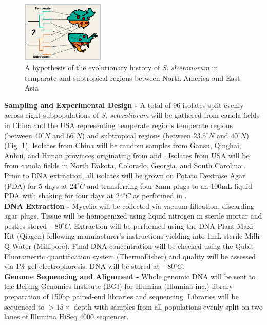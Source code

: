 \documentclass[12pt,letterpaper]{article}
\begin{document}
\begin{figure} %
  \includegraphics[width=0.35\textwidth]{figure/us-china.pdf}
  \caption{A hypothesis of the evolutionary history of \textit{S. slcerotiorum} in temparate and subtropical regions between North America and East Asia}
  \label{fig:us-china}
\end{figure}
\noindent \textbf{Sampling and Experimental Design -}
A total of 96 isolates split evenly across eight subpopulations of \textit{S. sclerotiorum} will be gathered from canola fields in China and the USA representing temperate regions temperate regions (between $40^{\circ}N$ and $66^{\circ}N$) and subtropical regions (between $23.5^{\circ}N$ and $40^{\circ}N$) (Fig. \ref{fig:us-china}).
Isolates from China will be random samples from Gansu, Qinghai, Anhui, and Hunan provinces originating from \citet{zhou2014dimethachlon} and \citet{attanayake2013sclerotinia}.
Isolates from USA will be from canola fields in North Dakota, Colorado, Georgia, and South Carolina \citep{aldrich-wolfe2015genetic,phillips2002phylogeography}.
Prior to DNA extraction, all isolates will be grown on Potato Dextrose Agar (PDA) for 5 days at $24^{\circ}C$ and transferring four 8mm plugs to an 100mL liquid PDA with shaking for four days at $24^{\circ}C$ as performed in \citet{derbyshire2017complete}.\\
\noindent \textbf{DNA Extraction -}
Mycelia will be collected via vacuum filtration, discarding agar plugs. Tissue will be homogenized using liquid nitrogen in sterile mortar and pestles stored $-80^{\circ}C$. Extraction will be performed using the DNA Plant Maxi Kit (Qiagen) following manufacturer's instructions yielding into 1mL sterile Milli-Q Water (Millipore). Final DNA concentration will be checked using the Qubit Fluorametric quantification system (ThermoFisher) and quality will be assessed via 1\% gel electrophoresis. DNA will be stored at $-80^{\circ}C$.\\
\noindent \textbf{Genome Sequencing and Alignment -} 
Whole genomic DNA will be sent to the Beijing Genomics Institute (BGI) for Illumina (Illumina inc.) library preparation of 150bp paired-end libraries and sequencing. Libraries will be sequenced to $>15\times$ depth with samples from all populations evenly split on two lanes of Illumina HiSeq 4000 sequencer.
\end{document}
